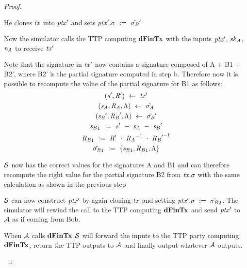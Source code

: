 \begin{proof}
\begin{asparaenum}
\begin{asparaenum}
            \item He clones $\mathit{tx}$ into ${\mathit{ptx}}'$ and sets ${\mathit{ptx}}'.\sigma ~:=~ {\tilde{\sigma_{\mathit{B}}}}'$
            \item Now the simulator calls the TTP computing $\mathbf{dFinTx}$ with the inputs ${\mathit{ptx}}'$, $\mathit{sk}_{\mathit{A}}$, $\mathit{\mathit{n}_{\mathit{A}}}$ to receive ${\mathit{tx}}'$
            \item Note that the signature in ${\mathit{tx}}'$ now contains a signature composed of A + B1 + B2', where B2' is the partial signature computed in step b.
            Therefore now it is possible to recompute the value of the partial signature for B1 as follows:
            \begin{gather*}
                ({\mathit{s}}', {\mathit{R}}') ~\leftarrow~ {\mathit{tx}}' \\
                (\mathit{s}_{\mathit{A}}, \mathit{R}_{\mathit{A}}, \Lambda) ~\leftarrow~ \tilde{\sigma_{\mathit{A}}} \\
                ({\mathit{s}_{\mathit{B}}}', {\mathit{R}_{\mathit{B}}}', \Lambda) ~\leftarrow~ {\tilde{\sigma_{\mathit{B}}}}' \\
                {\mathit{s}_{\mathit{B}}}_1 ~:=~ {\mathit{s}}' ~-~ \mathit{s}_{\mathit{A}} ~-~ {\mathit{s}_{\mathit{B}}}' \\
                {\mathit{R}_{\mathit{B}}}_1 ~:=~ {\mathit{R}}' ~\cdot~ {\mathit{R}_{\mathit{A}}}^{-1} ~\cdot~ {{\mathit{R}_{\mathit{B}}}'}^{-1} \\
                {\tilde{\sigma_{\mathit{B}}}}_1 ~:=~ \{ {\mathit{s}_{\mathit{B}}}_1, {\mathit{R}_{\mathit{B}}}_1, \Lambda \}
            \end{gather*}
            \item $\mathcal{S}$ now has the correct values for the signatures A and B1 and can therefore recompute the right value for the partial signature B2 from $\mathit{tx}.\sigma$ with the same calculation as shown in the previous step
        \end{asparaenum}
        \item $\mathcal{S}$ can now construct ${\mathit{ptx}}'$ by again cloning $\mathit{tx}$ and setting ${\mathit{ptx}}'.\sigma ~:=~ {\tilde{\sigma_{\mathit{B}}}}_2$.
        The simulator will rewind the call to the TTP computing $\mathbf{dFinTx}$ and send ${\mathit{ptx}}'$ to $\mathcal{A}$ as if coming from Bob.
        \item When $\mathcal{A}$ calls $\mathbf{dFinTx}$ $\mathcal{S}$ will forward the inputs to the TTP party computing $\mathbf{dFinTx}$, return the TTP outputs to $\mathcal{A}$ and finally output whatever $\mathcal{A}$ outputs.
    \end{asparaenum}


\end{proof}
